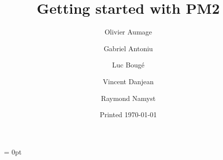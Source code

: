 \title{Getting started with PM2}

\author{Olivier Aumage \and Gabriel Antoniu \and Luc Boug\'e \and
  Vincent Danjean \and Raymond Namyst}

\date{Printed \today}

\maketitle

{\small \parskip = 0pt%
\tableofcontents
}
